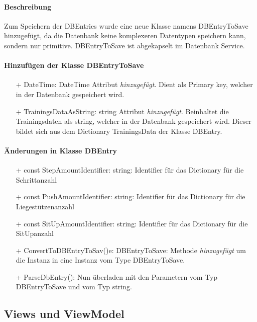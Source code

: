 \documentclass[a4paper,12pt]{article}
\begin{document}
\paragraph{Beschreibung}
Zum Speichern der DBEntries wurde eine neue Klasse namens DBEntryToSave hinzugefügt, da die Datenbank keine komplexeren Datentypen speichern kann, sondern nur primitive. DBEntryToSave ist abgekapselt im Datenbank Service. 

\paragraph{Hinzufügen der Klasse DBEntryToSave}
\begin{itemize}
	\item[+] DateTime: DateTime  Attribut \textit{hinzugefügt}. Dient als Primary key, welcher in der Datenbank gespeichert wird.
	\item[+] TrainingsDataAsString: string  Attribut \textit{hinzugefügt}. Beinhaltet die Trainingsdaten als string, welcher in der Datenbank gespeichert wird. Dieser bildet sich aus dem Dictionary TrainingsData der Klasse DBEntry.
\end{itemize}

\paragraph{Änderungen in Klasse DBEntry}

\begin{itemize}
	\item[+] const StepAmountIdentifier: string: Identifier für das Dictionary für die Schrittanzahl
	\item[+] const PushAmountIdentifier: string: Identifier für das Dictionary für die Liegestützenanzahl
	\item[+] const SitUpAmountIdentifier: string: Identifier für das Dictionary für die SitUpanzahl
	\item[+] ConvertToDBEntryToSav()e: DBEntryToSave: Methode \textit{hinzugefügt} um die Instanz in eine Instanz vom Type DBEntryToSave. 
	\item[+] ParseDbEntry(): Nun überladen mit den Parametern vom Typ DBEntryToSave und vom Typ string.
	
\end{itemize}

\subsection{Views und ViewModel}
\end{document}
